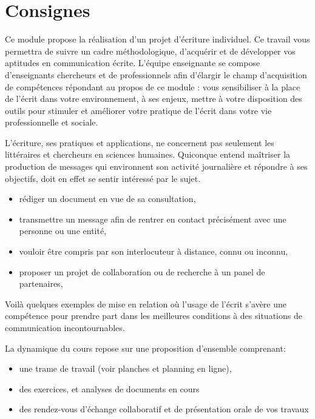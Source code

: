 \documentclass{./StyCls/MyArticle}
\begin{document}
\z

    \tableofcontents
    \z

\z

\section{Consignes}

Ce module propose la réalisation d'un projet d'écriture individuel. Ce travail vous permettra de suivre un cadre méthodologique, d'acquérir et de développer vos aptitudes en communication écrite. L'équipe enseignante se compose d'enseignants chercheurs et de professionnels afin d'élargir le champ d'acquisition de compétences répondant au propos de ce module : vous sensibiliser à la place de l'écrit dans votre environnement, à ses enjeux, mettre à votre disposition des outils pour stimuler et améliorer votre pratique de l'écrit dans votre vie professionnelle et sociale.

L'écriture, ses pratiques et applications, ne concernent pas seulement les littéraires et chercheurs en sciences humaines. Quiconque entend maîtriser la production de messages qui environnent son activité journalière et répondre à ses objectifs, doit en effet se sentir intéressé par le sujet.
\begin{itemize}
    \item rédiger un document en vue de sa consultation,
    \item transmettre un message afin de rentrer en contact précisément avec une personne ou une entité,
    \item vouloir être compris par son interlocuteur à distance, connu ou inconnu,
    \item proposer un projet de collaboration ou de recherche à un panel de partenaires,
\end{itemize}


Voilà quelques exemples de mise en relation où l'usage de l'écrit s'avère une compétence pour prendre part dans les meilleures conditions à des situations de communication incontournables.

La dynamique du cours repose sur une proposition d'ensemble comprenant:
\begin{itemize}
    \item une trame de travail (voir planches et planning en ligne),
    \item des exercices, et analyses de documents en cours
    \item des rendez-vous d'échange collaboratif et de présentation orale de vos travaux
\end{itemize}
\end{document}
